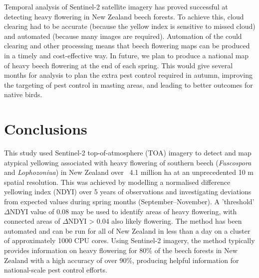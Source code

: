 \documentclass[remotesensing,article,submit,moreauthors,pdftex]{Definitions/mdpi}
\begin{document}
Temporal analysis of Sentinel-2 satellite imagery has proved successful at detecting heavy flowering in New Zealand
beech forests. To achieve this, cloud clearing had to be accurate
(because the yellow index is sensitive to missed cloud) and automated (because many images are required). Automation of the could clearing \citep{Shepherd2020} and other processing means that
beech flowering maps can be produced in a timely and cost-effective way. In future, we plan to produce a national map of heavy beech flowering at the end of each spring. This would give several months for analysis to
plan the extra pest control required in autumn, improving the targeting of pest control
in masting areas, and leading to better outcomes for native birds.


\section{Conclusions}

This study used Sentinel-2 top-of-atmosphere (TOA) imagery to detect and map atypical yellowing associated with heavy flowering
of southern beech (\emph{Fuscospora} and \emph{Lophozoniua}) in New Zealand over ~4.1 million ha at an unprecedented 10 m spatial resolution.
This was achieved by modelling a normalised difference yellowing index (NDYI) over 5 years of observations and
investigating deviations from expected values during spring months (September--November). A 'threshold' $\Delta\text{NDYI}$
value of 0.08 may be used to identify areas of heavy flowering, with connected areas of $\Delta\text{NDYI}$ > 0.04 also likely flowering.  The
method has been automated and can be run for all of New Zealand in less than a day on a cluster of approximately 1000 CPU cores. Using Sentinel-2 imagery, the method typically provides information on heavy flowering for 80\% of the beech forests in New Zealand with a high accuracy of over 90\%, 
producing helpful information for national-scale pest control efforts.


\vspace{6pt} 


\end{document}
